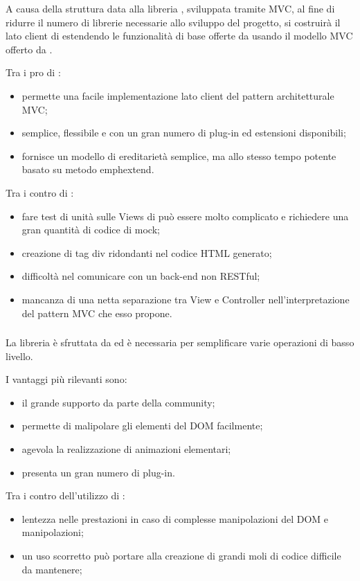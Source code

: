 A causa della struttura data alla libreria \jointjs{}, sviluppata tramite MVC, al fine di ridurre il numero di librerie necessarie allo sviluppo del progetto, si costruirà il lato client di \proj{} estendendo le funzionalità di base offerte da \jointjs{} usando il modello MVC offerto da \backbonejs.

Tra i pro di \backbonejs{}:
\begin{itemize}
	\item permette una facile implementazione lato client del pattern architetturale MVC;
	\item semplice, flessibile e con un gran numero di plug-in ed estensioni disponibili;
	\item fornisce un modello di ereditarietà semplice, ma allo stesso tempo potente basato su metodo emph{extend}.
\end{itemize}

Tra i contro di \backbonejs{}:
\begin{itemize}
	\item fare test di unità sulle Views di \backbonejs{} può essere molto complicato e richiedere una gran quantità di codice di mock;
	\item creazione di tag div ridondanti nel codice HTML generato;
	\item difficoltà nel comunicare con un back-end non RESTful;
	\item mancanza di una netta separazione tra View e Controller nell'interpretazione del pattern MVC che esso propone.
\end{itemize}

\subsubsection{\jquery}
La libreria \jquery{} è sfruttata da \jointjs{} ed è necessaria per semplificare varie operazioni di basso livello.

I vantaggi più rilevanti sono:
\begin{itemize}
	\item il grande supporto da parte della community;
	\item permette di malipolare gli elementi del DOM facilmente;
	\item agevola la realizzazione di animazioni elementari;
	\item presenta un gran numero di plug-in.
\end{itemize}

Tra i contro dell'utilizzo di \jquery{}:
\begin{itemize}
	\item lentezza nelle prestazioni in caso di complesse manipolazioni del DOM e manipolazioni;
	\item un uso scorretto può portare alla creazione di grandi moli di codice difficile da mantenere;
\end{itemize} 

